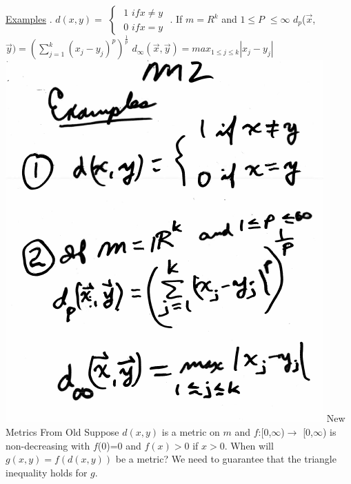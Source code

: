 \documentclass[10pt,a4paper]{article}
\begin{document}
{{\newpage
\underline{Examples}
. $d(x,y) =$
$\begin{cases}
\mbox { 1 } if x \neq y \\
\mbox { 0 } if x = y
\end{cases}$
. If $m=R^k$ and $1\leq P$ $\leq \infty$
\newline
$d_p$($\vec{x}$,$\vec{y}) = (\sum_{j=1}^{k} (x_j-y_j)^p)^\frac{1}{p}$
\newline
$d_\infty(\vec{x},\vec{y}) = max_{1\leq j \leq k} |x_j-y_j|$
\newline
\includegraphics[scale=.5]{Pages/MS_2_im2}
\newpage
New Metrics From Old
\newline
Suppose $d(x,y)$ is a metric 
\newline
on $m$ and $f$:[0,$\infty$)$\rightarrow$ [0,$\infty$) is non-decreasing with 
\newline
$f$(0)=0 and $f(x)>$0 if $x>$0.
\newline
When will
\newline
$g(x,y)=f(d(x,y))$ be a metric?
\newline
We need to guarantee that the triangle inequality holds for $g$.
\newline
}}
\end{document}
